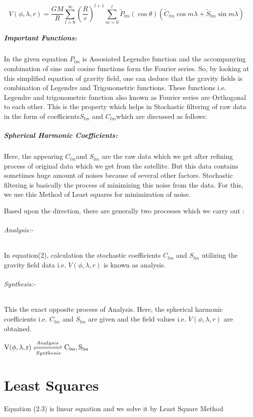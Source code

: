 \documentclass[a4paper,12pt]{report}
\begin{document}
\begin{equation}
V(\phi,\lambda,r)=\frac{GM}{R}\sum_{l=0}^{\infty} \left(\frac{R}{r}\right)^{l+1}\sum_{m=0}^{l} \widetilde{P}_{lm}(\cos\theta)(\widetilde{C}_{lm}\cos m\lambda + \widetilde{S}_{lm}\sin m\lambda)
\end{equation}

\paragraph{Important Functions:} 
In the given equation $P_{lm}$ is Assosiated Legendre function and the accompanying combination of sine and cosine functions form the Fourier series. So, by looking at this simplified equation of gravity field, one can deduce that the gravity fields is combination of Legendre and Trigonometric functions.
These functions i.e. Legendre and trigonometric function also known as Fourier series are Orthogonal to each other. This is the property which helps in Stochastic filtering of raw data in the form of coefficients$ S_{lm}$ and $C_{lm} $which are discussed as follows:  
\paragraph{Spherical Harmonic Coefficients:} 
Here, the appearing $C_{lm}$and $S_{lm}$ are the raw data which we get after refining process of original data which we get from the satellite. But this data contains sometimes huge amount of noises because of several other factors. Stochastic filtering is basically the process of minimizing this noise from the data. For this, we use this Method of Least squares for minimization of noise.

Based upon the direction, there are generally two processes which we carry out :

\subparagraph{Analysis:- }  In equation(2), calculation the stochastic coefficients $C_{lm} $ and $S_{lm}$ utilizing the gravity field data i.e. $V(\phi,\lambda,r)$ is known as analysis.
 \subparagraph{Synthesis:- } This the exact opposite process of Analysis. Here, the spherical harmonic coefficients i.e.  $C_{lm} $ and $S_{lm}$ are given and the field values i.e. $V(\phi,\lambda,r)$ are obtained. \\

\centerline{
$\mathrm{V(\phi,\lambda,r)} \xrightleftharpoons[Synthesis]{Analysis} \mathrm{C_{lm}, S_{lm}}$
}

\newpage
\chapter{Least Squares}
Equation (2.3) is linear equation and we solve it by Least Square Method
\end{document}
